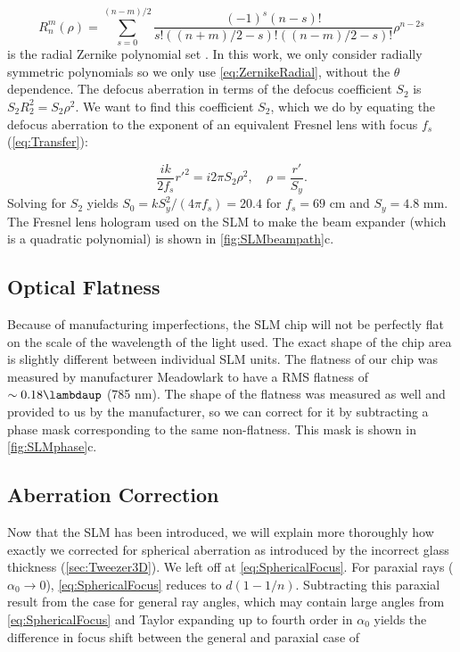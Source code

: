 \begin{equation}\label{eq:ZernikeRadial}
    R_{n}^{m}(\rho)=
    \sum_{s=0}^{(n-m) / 2}
    \frac{(-1)^{s}(n-s) !}{s !\left((n+m)/2-s\right) !\left((n-m)/2-s\right) !} \rho^{n-2 s}
\end{equation}
is the radial Zernike polynomial set \cite{Mahajan94}.
In this work, we only consider radially symmetric polynomials so we only use \cref{eq:ZernikeRadial}, without the $\theta$ dependence.
The defocus aberration in terms of the defocus coefficient $S_2$ is $S_2 R_2^2 = S_2\rho^2$.
We want to find this coefficient $S_2$, which we do by equating the defocus aberration to the exponent of an equivalent Fresnel lens with focus $f_s$ (\cref{eq:Transfer}):

\begin{equation}
    \frac{i k }{2 f_{s}}r'^2=i 2\pi S_2 \rho^2, \quad \rho = \frac{r'}{S_y}.
\end{equation}
Solving for $S_2$ yields $S_0 = k S_y^2/(4\pi f_s)= 20.4$ for $f_{s} = 69$ cm and  $S_y = 4.8$ mm.
The Fresnel lens hologram used on the SLM to make the beam expander (which is a quadratic polynomial) is shown in \ref{fig:SLMbeampath}c.


\subsection{Optical Flatness}\label{subsec:Flatness}

Because of manufacturing imperfections, the SLM chip will not be perfectly flat on the scale of the wavelength of the light used. 
The exact shape of the chip area is slightly different between individual SLM units.
The flatness of our chip was measured by manufacturer Meadowlark to have a RMS flatness of $\sim 0.18\lambdaup$ (785 nm).
The shape of the flatness was measured as well and provided to us by the manufacturer, so we can correct for it by subtracting a phase mask corresponding to the same non-flatness.
This mask is shown in \ref{fig:SLMphase}c.


\subsection{Aberration Correction}\label{subsec:AberrationCorrection}

Now that the SLM has been introduced, we will explain more thoroughly how exactly we corrected for spherical aberration as introduced by the incorrect glass thickness (\cref{sec:Tweezer3D}).
We left off at \cref{eq:SphericalFocus}.
For paraxial rays ($\alpha_0 \rightarrow 0$), \cref{eq:SphericalFocus} reduces to $d(1-1/n)$. 
Subtracting this paraxial result from the case for general ray angles, which may contain large angles from \cref{eq:SphericalFocus} and Taylor expanding up to fourth order in $\alpha_0$ yields the difference in focus shift between the general and paraxial case of \cite{Iwaniuk2011}

